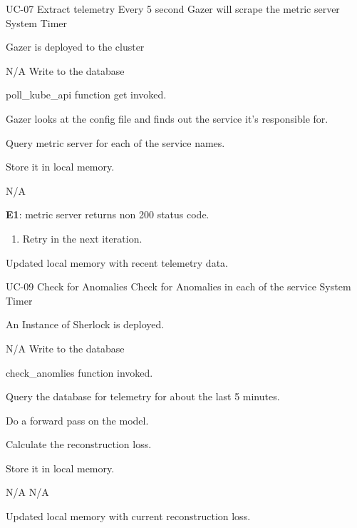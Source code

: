 \vspace{-2em}
\UseCaseDescription
{UC-07}
{Extract telemetry}
{Every 5 second Gazer will scrape the metric server}
{System Timer}
{\begin{CompactItemizes}
    \item Gazer is deployed to the cluster
\end{CompactItemizes}}
{N/A}
{Write to the database}
{\begin{CompactEnumerate}
    \item poll\_kube\_api function get invoked.
    \item Gazer looks at the config file and finds out the service it’s responsible for.
    \item Query metric server for each of the service names.
    \item Store it in local memory.
\end{CompactEnumerate}}
{{N/A}
{\textbf{E1}: metric server returns non 200 status code.
\vspace{-4mm}\begin{enumerate}
    \item Retry in the next iteration.
\vspace{-7mm}\end{enumerate}}
{\begin{CompactItemizes}
    \item Updated local memory with recent telemetry data.
\end{CompactItemizes}}}

\vspace{-2em}
\UseCaseDescription
{UC-09}
{Check for Anomalies}
{Check for Anomalies in each of the service}
{System Timer}
{\begin{CompactItemizes}
    \item An Instance of Sherlock is deployed.
\end{CompactItemizes}}
{N/A}
{Write to the database}
{\begin{CompactEnumerate}
    \item check\_anomlies function invoked.
    \item Query the database for telemetry for about the last 5 minutes.
    \item Do a forward pass on the model.
    \item Calculate the reconstruction loss.
    \item Store it in local memory.
\end{CompactEnumerate}}
{{N/A}
{N/A}
{\begin{CompactItemizes}
    \item Updated local memory with current reconstruction loss.
\end{CompactItemizes}}}
